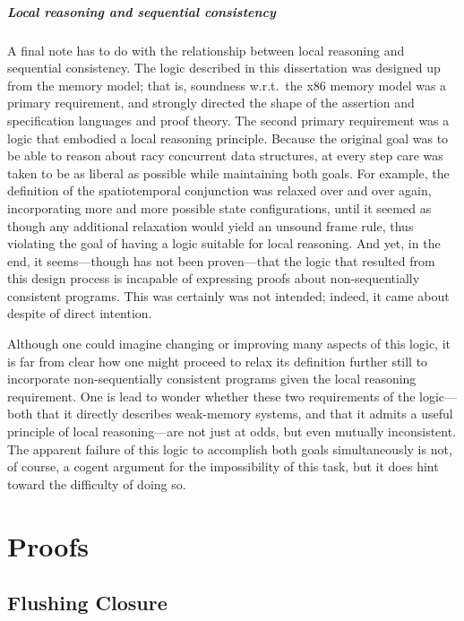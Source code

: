 \documentclass[11pt]{report}         %
\begin{document}
\paragraph{Local reasoning and sequential consistency} A final note has to do with the relationship between local reasoning and sequential consistency. The logic described in this dissertation was designed up from the memory model; that is, soundness w.r.t.\ the x86 memory model was a primary requirement, and strongly directed the shape of the assertion and specification languages and proof theory. The second primary requirement was a logic that embodied a local reasoning principle. Because the original goal was to be able to reason about racy concurrent data structures, at every step care was taken to be as liberal as possible while maintaining both goals. For example, the definition of the spatiotemporal conjunction was relaxed over and over again, incorporating more and more possible state configurations, until it seemed as though any additional relaxation would yield an unsound frame rule, thus violating the goal of having a logic suitable for local reasoning. And yet, in the end, it seems---though has not been proven---that the logic that resulted from this design process is incapable of expressing proofs about non-sequentially consistent programs. This was certainly was not intended; indeed, it came about despite of direct intention. 

Although one could imagine changing or improving many aspects of this logic, it is far from clear how one might proceed to relax its definition further still to incorporate non-sequentially consistent programs given the local reasoning requirement. One is lead to wonder whether these two requirements of the logic---both that it directly describes weak-memory systems, and that it admits a useful principle of local reasoning---are not just at odds, but even mutually inconsistent. The apparent failure of this logic to accomplish both goals simultaneously is not, of course, a cogent argument for the impossibility of this task, but it does hint toward the difficulty of doing so. 

\appendix

\chapter{Proofs}
\label{ch:proofs}

\section{Flushing Closure}
\label{sec:flushing-closure-proofs}
\end{document}
